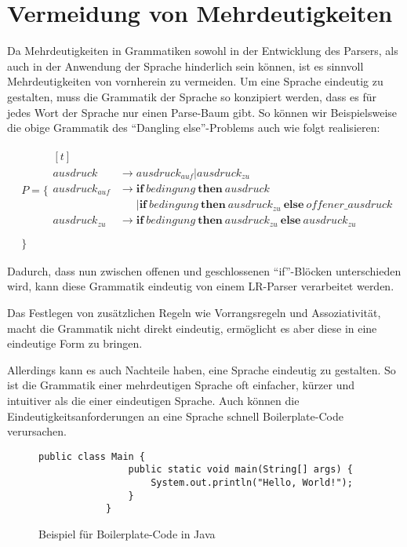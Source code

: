 \documentclass[runningheads]{llncs}
\begin{document}
	\section{Vermeidung von Mehrdeutigkeiten}\label{sec:vermeidung-von-mehrdeutigkeiten}

	Da Mehrdeutigkeiten in Grammatiken sowohl in der Entwicklung des Parsers,
	als auch in der Anwendung der Sprache hinderlich sein können,
	ist es sinnvoll Mehrdeutigkeiten von vornherein zu vermeiden.
	Um eine Sprache eindeutig zu gestalten,
	muss die Grammatik der Sprache so konzipiert werden,
	dass es für jedes Wort der Sprache nur einen Parse-Baum gibt.
	So können wir Beispielsweise die obige Grammatik des ``Dangling else''-Problems auch wie folgt realisieren\cite{Abrahams1966}:

	\begin{align*}
		& P = \{ \begin{aligned}[t]
			         \\
			         ausdruck & \rightarrow ausdruck_{auf} | ausdruck_{zu} \\
			         ausdruck_{auf} & \rightarrow \textbf{if} \ bedingung \ \textbf{then} \ ausdruck \\
			         \phantom{A} & \phantom{\rightarrow} \vert \textbf{if} \ bedingung \ \textbf{then} \ ausdruck_{zu} \ \textbf{else} \ offener\_ausdruck \\
			         ausdruck_{zu} & \rightarrow \textbf{if} \ bedingung \ \textbf{then} \ ausdruck_{zu} \ \textbf{else} \ ausdruck_{zu} \\
		\end{aligned} \\
		& \}
	\end{align*}

	Dadurch, dass nun zwischen offenen und geschlossenen ``if''-Blöcken unterschieden wird,
	kann diese Grammatik eindeutig von einem LR-Parser verarbeitet werden.

	Das Festlegen von zusätzlichen Regeln wie Vorrangsregeln und Assoziativität,
	macht die Grammatik nicht direkt eindeutig,
	ermöglicht es aber diese in eine eindeutige Form zu bringen.

	Allerdings kann es auch Nachteile haben, eine Sprache eindeutig zu gestalten.
	So ist die Grammatik einer mehrdeutigen Sprache oft einfacher, kürzer und intuitiver als die einer eindeutigen Sprache.
	Auch können die Eindeutigkeitsanforderungen an eine Sprache schnell Boilerplate-Code verursachen.

	\begin{figure}
		\begin{lstlisting}[style=lstStyle,label={lst:lstlisting3}]
			public class Main {
			    public static void main(String[] args) {
			        System.out.println("Hello, World!");
			    }
			}
		\end{lstlisting}
		\caption{Beispiel für Boilerplate-Code in Java}
		\label{fig:figure4}
	\end{figure}
\end{document}
